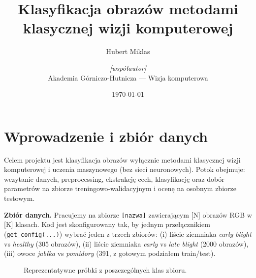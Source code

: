 \documentclass[10pt,a4paper]{article}
\title{\vspace{-1.5em}Klasyfikacja obrazów metodami klasycznej wizji komputerowej}
\author{Hubert Miklas \and \textit{[współautor]} \\[2pt]
\small Akademia Górniczo-Hutnicza --- Wizja komputerowa}
\date{\vspace{-1em}\small \today}
\begin{document}
\maketitle
\vspace{-1.5em}

\section{Wprowadzenie i zbiór danych}
Celem projektu jest klasyfikacja obrazów wyłącznie metodami klasycznej wizji
komputerowej i uczenia maszynowego (bez sieci neuronowych). Potok obejmuje:
wczytanie danych, preprocessing, ekstrakcję cech, klasyfikację oraz dobór
parametrów na zbiorze treningowo-walidacyjnym i ocenę na osobnym zbiorze
testowym.

\textbf{Zbiór danych.} %
Pracujemy na zbiorze \texttt{[nazwa]} zawierającym \num{[N]} obrazów RGB
w \num{[K]} klasach. Kod jest skonfigurowany tak, by jednym przełącznikiem
(\texttt{get\_config(...)}) wybrać jeden z trzech zbiorów:
(i) liście ziemniaka \emph{early blight} vs \emph{healthy} (\num{305} obrazów),
(ii) liście ziemniaka \emph{early} vs \emph{late blight} (\num{2000} obrazów),
(iii) owoce \emph{jabłka} vs \emph{pomidory} (\num{391}, z gotowym podziałem
train/test). %

\begin{figure}[h]
  \centering
  \caption{Reprezentatywne próbki z poszczególnych klas zbioru.}
  \label{fig:samples}
\end{figure}

\end{document}
